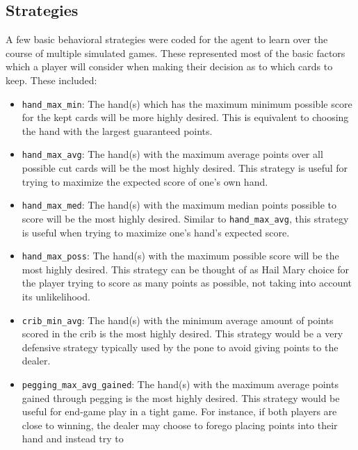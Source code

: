 
\subsection{Strategies}
\label{sec:dm-methods-strategies}


A few basic behavioral strategies were coded for the agent to learn
over the course of multiple simulated games.
%
These represented most of the basic factors which a player will consider when
making their decision as to which cards to keep.
%
These included:
\begin{itemize}
\item \texttt{hand\_max\_min}:
	The hand(s) which has the maximum minimum possible score for the kept cards
	will be more highly desired.
	This is equivalent to choosing the hand with the largest guaranteed points.
\item \texttt{hand\_max\_avg}:
	The hand(s) with the maximum average points over all possible cut cards will
	be the most highly desired.
	This strategy is useful for trying to maximize the expected score of one's
	own hand.
\item \texttt{hand\_max\_med}:
	The hand(s) with the maximum median points possible to score will be the most
	highly desired.
	Similar to \texttt{hand\_max\_avg}, this strategy is useful when trying to
	maximize one's hand's expected score.
\item \texttt{hand\_max\_poss}:
	The hand(s) with the maximum possible score will be the most highly desired.
	This strategy can be thought of as Hail Mary choice for the player trying to
	score as many points as possible, not taking into account its unlikelihood.
\item \texttt{crib\_min\_avg}:
	The hand(s) with the minimum average amount of points scored in the crib is
	the most highly desired.
	This strategy would be a very defensive strategy typically used by the pone
	to avoid giving points to the dealer.
\item \texttt{pegging\_max\_avg\_gained}:
	The hand(s) with the maximum average points gained through pegging is the most
	highly desired.
	This strategy would be useful for end-game play in a tight game.
	For instance, if both players are close to winning, the dealer may
	choose to forego placing points into their hand and instead try to

\end{itemize}
